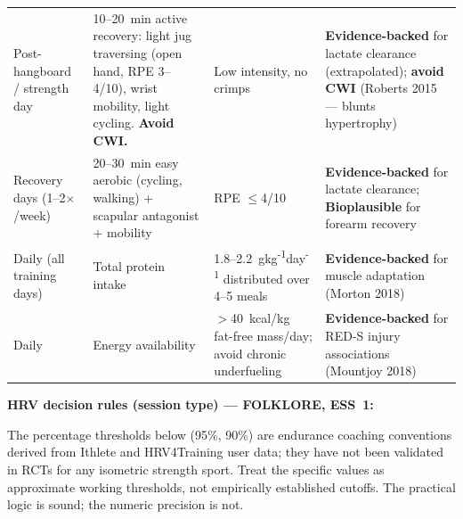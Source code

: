 \begin{center}
\begin{longtable}{>{\raggedright}p{3.2cm} >{\raggedright}p{3.5cm} >{\raggedright}p{3.0cm} >{\raggedright\arraybackslash}p{5.5cm}}
Post-hangboard / strength day & 10--20~min active recovery: light jug traversing (open hand, RPE 3--4/10), wrist mobility, light cycling. \textbf{Avoid CWI.} & Low intensity, no crimps & \textbf{Evidence-backed} for lactate clearance (extrapolated); \textbf{avoid CWI} (Roberts 2015 --- blunts hypertrophy) \\

Recovery days (1--2$\times$/week) & 20--30~min easy aerobic (cycling, walking) + scapular antagonist + mobility & RPE $\leq$4/10 & \textbf{Evidence-backed} for lactate clearance; \textbf{Bioplausible} for forearm recovery \\

Daily (all training days) & Total protein intake & 1.8--2.2~g\textperiodcentered{}kg\textsuperscript{-1}\textperiodcentered{}day\textsuperscript{-1} distributed over 4--5 meals & \textbf{Evidence-backed} for muscle adaptation (Morton 2018) \\

Daily & Energy availability & $>$40~kcal/kg fat-free mass/day; avoid chronic underfueling & \textbf{Evidence-backed} for RED-S injury associations (Mountjoy 2018) \\

\end{longtable}
\end{center}

\textbf{HRV decision rules (session type) --- FOLKLORE, ESS~1:}

The percentage thresholds below (95\%, 90\%) are endurance coaching conventions derived from Ithlete and HRV4Training user data; they have not been validated in RCTs for any isometric strength sport. Treat the specific values as approximate working thresholds, not empirically established cutoffs. The practical logic is sound; the numeric precision is not.

